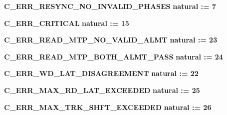 \begin{DoxyCompactItemize}
\item 
{\bf C\+\_\+\+E\+R\+R\+\_\+\+R\+E\+S\+Y\+N\+C\+\_\+\+N\+O\+\_\+\+I\+N\+V\+A\+L\+I\+D\+\_\+\+P\+H\+A\+S\+ES} {\bfseries \textcolor{comment}{natural}\textcolor{vhdlchar}{ }\textcolor{vhdlchar}{ }\textcolor{vhdlchar}{\+:}\textcolor{vhdlchar}{=}\textcolor{vhdlchar}{ }\textcolor{vhdlchar}{ } \textcolor{vhdldigit}{7} \textcolor{vhdlchar}{ }} 
\item 
{\bf C\+\_\+\+E\+R\+R\+\_\+\+C\+R\+I\+T\+I\+C\+AL} {\bfseries \textcolor{comment}{natural}\textcolor{vhdlchar}{ }\textcolor{vhdlchar}{ }\textcolor{vhdlchar}{\+:}\textcolor{vhdlchar}{=}\textcolor{vhdlchar}{ }\textcolor{vhdlchar}{ } \textcolor{vhdldigit}{15} \textcolor{vhdlchar}{ }} 
\item 
{\bf C\+\_\+\+E\+R\+R\+\_\+\+R\+E\+A\+D\+\_\+\+M\+T\+P\+\_\+\+N\+O\+\_\+\+V\+A\+L\+I\+D\+\_\+\+A\+L\+MT} {\bfseries \textcolor{comment}{natural}\textcolor{vhdlchar}{ }\textcolor{vhdlchar}{ }\textcolor{vhdlchar}{\+:}\textcolor{vhdlchar}{=}\textcolor{vhdlchar}{ }\textcolor{vhdlchar}{ } \textcolor{vhdldigit}{23} \textcolor{vhdlchar}{ }} 
\item 
{\bf C\+\_\+\+E\+R\+R\+\_\+\+R\+E\+A\+D\+\_\+\+M\+T\+P\+\_\+\+B\+O\+T\+H\+\_\+\+A\+L\+M\+T\+\_\+\+P\+A\+SS} {\bfseries \textcolor{comment}{natural}\textcolor{vhdlchar}{ }\textcolor{vhdlchar}{ }\textcolor{vhdlchar}{\+:}\textcolor{vhdlchar}{=}\textcolor{vhdlchar}{ }\textcolor{vhdlchar}{ } \textcolor{vhdldigit}{24} \textcolor{vhdlchar}{ }} 
\item 
{\bf C\+\_\+\+E\+R\+R\+\_\+\+W\+D\+\_\+\+L\+A\+T\+\_\+\+D\+I\+S\+A\+G\+R\+E\+E\+M\+E\+NT} {\bfseries \textcolor{comment}{natural}\textcolor{vhdlchar}{ }\textcolor{vhdlchar}{ }\textcolor{vhdlchar}{\+:}\textcolor{vhdlchar}{=}\textcolor{vhdlchar}{ }\textcolor{vhdlchar}{ } \textcolor{vhdldigit}{22} \textcolor{vhdlchar}{ }} 
\item 
{\bf C\+\_\+\+E\+R\+R\+\_\+\+M\+A\+X\+\_\+\+R\+D\+\_\+\+L\+A\+T\+\_\+\+E\+X\+C\+E\+E\+D\+ED} {\bfseries \textcolor{comment}{natural}\textcolor{vhdlchar}{ }\textcolor{vhdlchar}{ }\textcolor{vhdlchar}{\+:}\textcolor{vhdlchar}{=}\textcolor{vhdlchar}{ }\textcolor{vhdlchar}{ } \textcolor{vhdldigit}{25} \textcolor{vhdlchar}{ }} 
\item 
{\bf C\+\_\+\+E\+R\+R\+\_\+\+M\+A\+X\+\_\+\+T\+R\+K\+\_\+\+S\+H\+F\+T\+\_\+\+E\+X\+C\+E\+E\+D\+ED} {\bfseries \textcolor{comment}{natural}\textcolor{vhdlchar}{ }\textcolor{vhdlchar}{ }\textcolor{vhdlchar}{\+:}\textcolor{vhdlchar}{=}\textcolor{vhdlchar}{ }\textcolor{vhdlchar}{ } \textcolor{vhdldigit}{26} \textcolor{vhdlchar}{ }} 

\end{DoxyCompactItemize}
